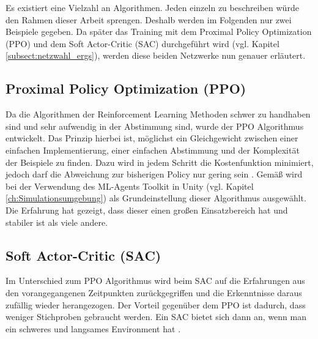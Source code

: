 Es existiert eine Vielzahl an Algorithmen. Jeden einzeln zu beschreiben würde den Rahmen dieser Arbeit sprengen. Deshalb werden im Folgenden nur zwei Beispiele gegeben. Da später das Training mit dem Proximal Policy Optimization (PPO) und dem Soft Actor-Critic (SAC) durchgeführt wird (vgl. Kapitel \ref{subsect:netzwahl_ergs}), werden diese beiden Netzwerke nun genauer erläutert. 

\subsection{Proximal Policy Optimization (PPO)}
\label{subsect:ppo}
Da die Algorithmen der Reinforcement Learning Methoden schwer zu handhaben sind und sehr aufwendig in der Abstimmung sind, wurde der PPO Algorithmus entwickelt. Das Prinzip hierbei ist, möglichst ein Gleichgewicht zwischen einer einfachen Implementierung, einer einfachen Abstimmung und der Komplexität der Beispiele zu finden. Dazu wird in jedem Schritt die Kostenfunktion minimiert, jedoch darf die Abweichung zur bisherigen Policy nur gering sein \cite{ppo}.
Gemäß \cite{ppo_git} wird bei der Verwendung des ML-Agents Toolkit in Unity (vgl. Kapitel \ref{ch:Simulationsumgebung}) als Grundeinstellung dieser Algorithmus ausgewählt. Die Erfahrung hat gezeigt, dass dieser einen großen Einsatzbereich hat und stabiler ist als viele andere.

\subsection{Soft Actor-Critic (SAC)}
\label{subsect:sac}
Im Unterschied zum PPO Algorithmus wird beim SAC auf die Erfahrungen aus den vorangegangenen Zeitpunkten zurückgegriffen und die Erkenntnisse daraus zufällig wieder herangezogen. Der Vorteil gegenüber dem PPO ist dadurch, dass weniger Stichproben gebraucht werden. Ein SAC bietet sich dann an, wenn man ein schweres und langsames Environment hat \cite{ppo_git}.



